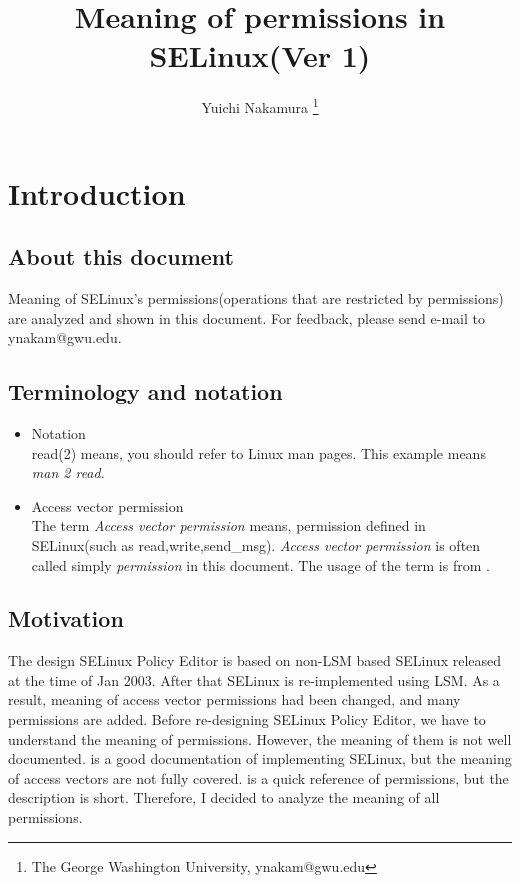 \documentclass{article}
\title{Meaning of permissions in SELinux(Ver 1)}
\author{Yuichi Nakamura \thanks{The George Washington University,
ynakam@gwu.edu}}
\begin{document}
\def\labelenumi{(\theenumi)}
\maketitle
\tableofcontents
\newpage

\section{Introduction}
\subsection{About this document}
Meaning of SELinux's permissions(operations that are restricted by permissions) are
analyzed and shown in this document.
For feedback, please send e-mail to ynakam@gwu.edu.

\subsection{Terminology and notation}
\begin{itemize}
 \item Notation\\
       read(2) means, you should refer to Linux man pages. This
example means {\it man 2 read}.
 \item Access vector permission\\
       The term {\it Access vector permission} means, permission defined
       in SELinux(such as read,write,send\_msg). {\it Access vector
       permission } is often called simply {\it permission } in this
       document. The usage of the term is from \cite{configpolicy}.
\end{itemize} 

\subsection{Motivation}
The design SELinux Policy Editor\cite{seedit} is based on non-LSM based SELinux released at the time of Jan 2003. After that SELinux is re-implemented
using LSM. As a result, meaning of access vector permissions had been changed, and many
permissions are added. Before re-designing SELinux Policy Editor, we have to understand the meaning of permissions.  However, the meaning of them
is not well documented. \cite{selinuximplementation} is a good
documentation of implementing SELinux, but the meaning of access
vectors are not fully covered. \cite{tresysav} is a quick reference of
permissions, but the description is short.  Therefore, I decided
to analyze the meaning of all permissions.
\end{document}
